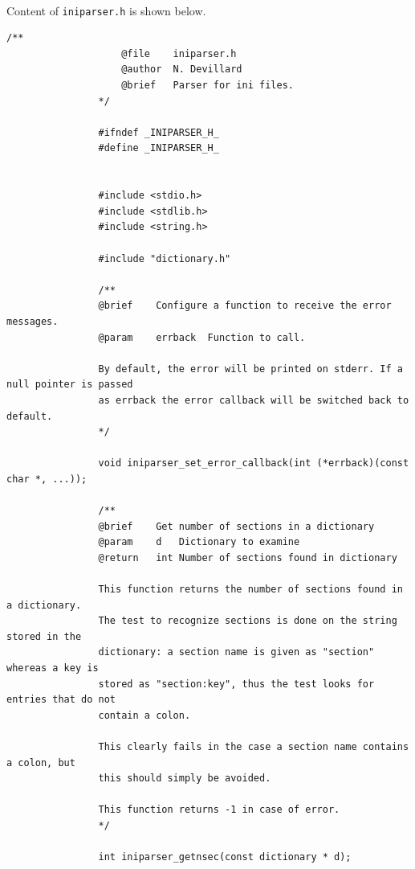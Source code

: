 \documentclass{article}
\begin{document}
            \paragraph{}
                Content of \texttt{iniparser.h} is shown below.
            \begin{Verbatim}[gobble=8]
                /**
                    @file    iniparser.h
                    @author  N. Devillard
                    @brief   Parser for ini files.
                */
                
                #ifndef _INIPARSER_H_
                #define _INIPARSER_H_
                
                
                #include <stdio.h>
                #include <stdlib.h>
                #include <string.h>
                
                #include "dictionary.h"
                
                /**
                @brief    Configure a function to receive the error messages.
                @param    errback  Function to call.
                
                By default, the error will be printed on stderr. If a null pointer is passed
                as errback the error callback will be switched back to default.
                */
                
                void iniparser_set_error_callback(int (*errback)(const char *, ...));
                
                /**
                @brief    Get number of sections in a dictionary
                @param    d   Dictionary to examine
                @return   int Number of sections found in dictionary
                
                This function returns the number of sections found in a dictionary.
                The test to recognize sections is done on the string stored in the
                dictionary: a section name is given as "section" whereas a key is
                stored as "section:key", thus the test looks for entries that do not
                contain a colon.
                
                This clearly fails in the case a section name contains a colon, but
                this should simply be avoided.
                
                This function returns -1 in case of error.
                */
                
                int iniparser_getnsec(const dictionary * d);
                

\end{Verbatim}
\end{document}
